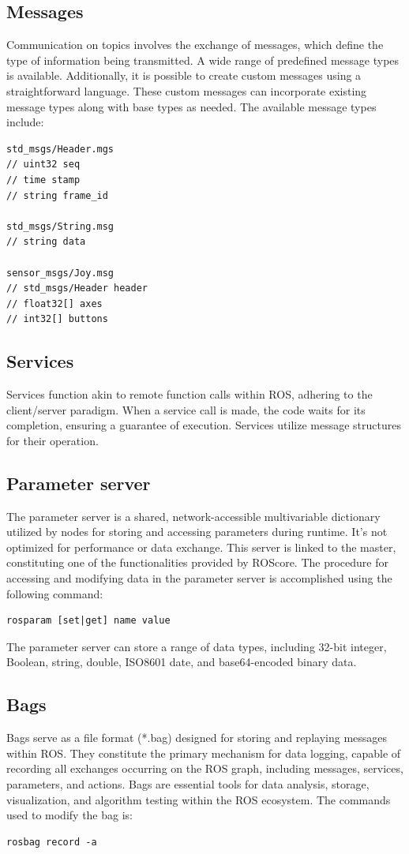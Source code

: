 \subsection{Messages}
Communication on topics involves the exchange of messages, which define the type of information being transmitted. 
A wide range of predefined message types is available.
Additionally, it is possible to create custom messages using a straightforward language. 
These custom messages can incorporate existing message types along with base types as needed.
The available message types include:
\begin{verbatim}
std_msgs/Header.mgs
// uint32 seq
// time stamp
// string frame_id

std_msgs/String.msg
// string data

sensor_msgs/Joy.msg
// std_msgs/Header header
// float32[] axes
// int32[] buttons
\end{verbatim}

\subsection{Services}
Services function akin to remote function calls within ROS, adhering to the client/server paradigm. 
When a service call is made, the code waits for its completion, ensuring a guarantee of execution. 
Services utilize message structures for their operation.

\subsection{Parameter server}
The parameter server is a shared, network-accessible multivariable dictionary utilized by nodes for storing and accessing parameters during runtime. 
It's not optimized for performance or data exchange. 
This server is linked to the master, constituting one of the functionalities provided by ROScore.
The procedure for accessing and modifying data in the parameter server is accomplished using the following command:
\begin{verbatim}
rosparam [set|get] name value
\end{verbatim}
The parameter server can store a range of data types, including 32-bit integer, Boolean, string, double, ISO8601 date, and base64-encoded binary data.

\subsection{Bags}
Bags serve as a file format (*.bag) designed for storing and replaying messages within ROS. 
They constitute the primary mechanism for data logging, capable of recording all exchanges occurring on the ROS graph, including messages, services, parameters, and actions. 
Bags are essential tools for data analysis, storage, visualization, and algorithm testing within the ROS ecosystem.
The commands used to modify the bag is: 
\begin{verbatim}
rosbag record -a
\end{verbatim}

